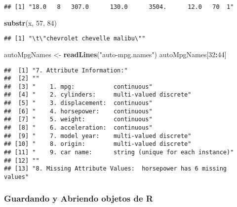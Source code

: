 \documentclass[]{article}
\newenvironment{Shaded}{\begin{snugshade}}{\end{snugshade}}
\newcommand{\DecValTok}[1]{\textcolor[rgb]{0.00,0.00,0.81}{#1}}
\newcommand{\KeywordTok}[1]{\textcolor[rgb]{0.13,0.29,0.53}{\textbf{#1}}}
\newcommand{\NormalTok}[1]{#1}
\newcommand{\OperatorTok}[1]{\textcolor[rgb]{0.81,0.36,0.00}{\textbf{#1}}}
\newcommand{\StringTok}[1]{\textcolor[rgb]{0.31,0.60,0.02}{#1}}
\begin{document}
\begin{verbatim}
## [1] "18.0   8   307.0      130.0      3504.      12.0   70  1"
\end{verbatim}

\begin{Shaded}
\begin{Highlighting}[]
\KeywordTok{substr}\NormalTok{(x, }\DecValTok{57}\NormalTok{, }\DecValTok{84}\NormalTok{)}
\end{Highlighting}
\end{Shaded}

\begin{verbatim}
## [1] "\t\"chevrolet chevelle malibu\""
\end{verbatim}

\begin{Shaded}
\begin{Highlighting}[]
\NormalTok{autoMpgNames <-}\StringTok{ }\KeywordTok{readLines}\NormalTok{(}\StringTok{"auto-mpg.names"}\NormalTok{)}
\NormalTok{autoMpgNames[}\DecValTok{32}\OperatorTok{:}\DecValTok{44}\NormalTok{]}
\end{Highlighting}
\end{Shaded}

\begin{verbatim}
##  [1] "7. Attribute Information:"                                    
##  [2] ""                                                             
##  [3] "    1. mpg:           continuous"                             
##  [4] "    2. cylinders:     multi-valued discrete"                  
##  [5] "    3. displacement:  continuous"                             
##  [6] "    4. horsepower:    continuous"                             
##  [7] "    5. weight:        continuous"                             
##  [8] "    6. acceleration:  continuous"                             
##  [9] "    7. model year:    multi-valued discrete"                  
## [10] "    8. origin:        multi-valued discrete"                  
## [11] "    9. car name:      string (unique for each instance)"      
## [12] ""                                                             
## [13] "8. Missing Attribute Values:  horsepower has 6 missing values"
\end{verbatim}

\hypertarget{guardando-y-abriendo-objetos-de-r}{%
\subsubsection{Guardando y Abriendo objetos de
R}\label{guardando-y-abriendo-objetos-de-r}}
\end{document}
